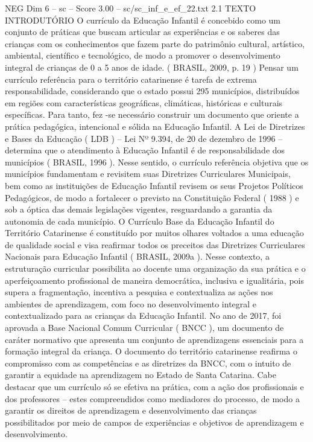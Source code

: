 \begin{textsample}{NEG Dim 6 – sc – Score 3.00 – sc/sc\_inf\_e\_ef\_22.txt}  \label{ex:f6_neg_280}
2.1 TEXTO INTRODUTÓRIO O currículo da Educação Infantil é concebido como um conjunto de práticas que buscam articular as experiências e os saberes das crianças com os conhecimentos que fazem parte do patrimônio cultural, artístico, ambiental, científico e tecnológico, de modo a promover o desenvolvimento integral de crianças de 0 a 5 anos de idade. ( BRASIL, 2009, p. 19 ) Pensar um currículo referência para o território catarinense é tarefa de extrema responsabilidade, considerando que o estado possui 295 municípios, distribuídos em regiões com características geográficas, climáticas, históricas e culturais específicas.
Para tanto, fez -se necessário construir um documento que oriente a prática pedagógica, intencional e sólida na Educação Infantil.
A Lei de Diretrizes e Bases da Educação ( LDB ) – Lei Nº 9.394, de 20 de dezembro de 1996 – determina que o atendimento à Educação Infantil é de responsabilidade dos municípios ( BRASIL, 1996 ).
Nesse sentido, o currículo referência objetiva que os municípios fundamentam e revisitem suas Diretrizes Curriculares Municipais, bem como as instituições de Educação Infantil revisem os seus Projetos Políticos Pedagógicos, de modo a fortalecer o previsto na Constituição Federal ( 1988 ) e sob a óptica das demais legislações vigentes, resguardando a garantia da autonomia de cada município.
O Currículo Base da Educação Infantil do Território Catarinense é constituído por muitos olhares voltados a uma educação de qualidade social e visa reafirmar todos os preceitos das Diretrizes Curriculares Nacionais para Educação Infantil ( BRASIL, 2009a ).
Nesse contexto, a estruturação curricular possibilita ao docente uma organização da sua prática e o aperfeiçoamento profissional de maneira democrática, inclusiva e igualitária, pois supera a fragmentação, incentiva a pesquisa e contextualiza as ações nos ambientes de aprendizagem, com foco no desenvolvimento integral e contextualizado para as crianças da Educação Infantil.
No ano de 2017, foi aprovada a Base Nacional Comum Curricular ( BNCC ), um documento de caráter normativo que apresenta um conjunto de aprendizagens essenciais para a formação integral da criança.
O documento do território catarinense reafirma o compromisso com as competências e as diretrizes da BNCC, com o intuito de garantir a equidade na aprendizagem no Estado de Santa Catarina.
Cabe destacar que um currículo só se efetiva na prática, com a ação dos profissionais e dos professores – estes compreendidos como mediadores do processo, de modo a garantir os direitos de aprendizagem e desenvolvimento das crianças possibilitados por meio de campos de experiências e objetivos de aprendizagem e desenvolvimento.

\end{textsample}
